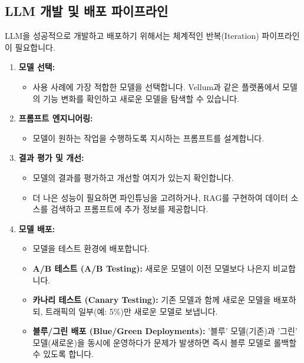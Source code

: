 \documentclass[11pt,a4paper]{article}
\theoremstyle{definition}
\begin{document}
\subsection{LLM 개발 및 배포 파이프라인}

LLM을 성공적으로 개발하고 배포하기 위해서는 체계적인 반복(Iteration) 파이프라인이 필요합니다.

\begin{enumerate}
    \item \textbf{모델 선택:}
    \begin{itemize}
        \item 사용 사례에 가장 적합한 모델을 선택합니다. Vellum과 같은 플랫폼에서 모델의 기능 변화를 확인하고 새로운 모델을 탐색할 수 있습니다.
    \end{itemize}

    \item \textbf{프롬프트 엔지니어링:}
    \begin{itemize}
        \item 모델이 원하는 작업을 수행하도록 지시하는 프롬프트를 설계합니다.
    \end{itemize}

    \item \textbf{결과 평가 및 개선:}
    \begin{itemize}
        \item 모델의 결과를 평가하고 개선할 여지가 있는지 확인합니다.
        \item 더 나은 성능이 필요하면 파인튜닝을 고려하거나, RAG를 구현하여 데이터 소스를 검색하고 프롬프트에 추가 정보를 제공합니다.
    \end{itemize}

    \item \textbf{모델 배포:}
    \begin{itemize}
        \item 모델을 테스트 환경에 배포합니다.
        \item \textbf{A/B 테스트 (A/B Testing):} 새로운 모델이 이전 모델보다 나은지 비교합니다.
        \item \textbf{카나리 테스트 (Canary Testing):} 기존 모델과 함께 새로운 모델을 배포하되, 트래픽의 일부(예: 5\%)만 새로운 모델로 보냅니다.
        \item \textbf{블루/그린 배포 (Blue/Green Deployments):} '블루' 모델(기존)과 '그린' 모델(새로운)을 동시에 운영하다가 문제가 발생하면 즉시 블루 모델로 롤백할 수 있도록 합니다.
    \end{itemize}
\end{enumerate}
\end{document}
